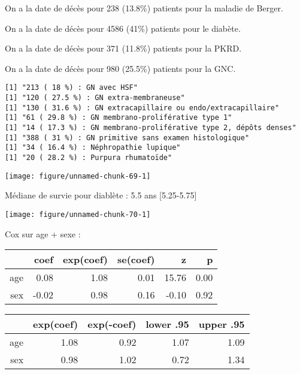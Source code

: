 \documentclass[11pt,a4paper]{article}\usepackage[]{graphicx}\usepackage[]{color}
\makeatletter
\def\maxwidth{ %
  \ifdim\Gin@nat@width>\linewidth
    \linewidth
  \else
    \Gin@nat@width
  \fi
}
\newenvironment{kframe}{%
 \def\at@end@of@kframe{}%
 \ifinner\ifhmode%
  \def\at@end@of@kframe{\end{minipage}}%
  \begin{minipage}{\columnwidth}%
 \fi\fi%
 \def\FrameCommand##1{\hskip\@totalleftmargin \hskip-\fboxsep
 \colorbox{shadecolor}{##1}\hskip-\fboxsep
     \hskip-\linewidth \hskip-\@totalleftmargin \hskip\columnwidth}%
 \MakeFramed {\advance\hsize-\width
   \@totalleftmargin\z@ \linewidth\hsize
   \@setminipage}}%
 {\par\unskip\endMakeFramed%
 \at@end@of@kframe}
\newenvironment{knitrout}{}{} %
\makeatother
\begin{document}
  On a la date de décès pour 238 (13.8\%) patients pour la maladie de Berger.
  
  On a la date de décès pour 4586 (41\%) patients pour le diabète.
  
  On a la date de décès pour 371 (11.8\%) patients pour la PKRD.
  
  On a la date de décès pour 980 (25.5\%) patients pour la GNC.

\begin{knitrout}
\color{fgcolor}\begin{kframe}
\begin{verbatim}
[1] "213 ( 18 %) : GN avec HSF"
[1] "120 ( 27.5 %) : GN extra-membraneuse"
[1] "130 ( 31.6 %) : GN extracapillaire ou endo/extracapillaire"
[1] "61 ( 29.8 %) : GN membrano-proliférative type 1"
[1] "14 ( 17.3 %) : GN membrano-proliférative type 2, dépôts denses"
[1] "388 ( 31 %) : GN primitive sans examen histologique"
[1] "34 ( 16.4 %) : Néphropathie lupique"
[1] "20 ( 28.2 %) : Purpura rhumatoïde"
\end{verbatim}
\end{kframe}
\end{knitrout}


\begin{knitrout}
\color{fgcolor}
\texttt{[image: figure/unnamed-chunk-69-1]} 

\end{knitrout}

Médiane de survie pour diablète : 5.5 ans [5.25-5.75]

\begin{knitrout}
\color{fgcolor}
\texttt{[image: figure/unnamed-chunk-70-1]} 

\end{knitrout}

Cox sur age + sexe :
\begin{table}[H]
\centering
\begin{tabular}{rrrrrr}
  \hline
 & coef & exp(coef) & se(coef) & z & p \\ 
  \hline
age & 0.08 & 1.08 & 0.01 & 15.76 & 0.00 \\ 
  sex & -0.02 & 0.98 & 0.16 & -0.10 & 0.92 \\ 
   \hline
\end{tabular}
\end{table}
\begin{table}[H]
\centering
\begin{tabular}{rrrrr}
  \hline
 & exp(coef) & exp(-coef) & lower .95 & upper .95 \\ 
  \hline
age & 1.08 & 0.92 & 1.07 & 1.09 \\ 
  sex & 0.98 & 1.02 & 0.72 & 1.34 \\ 
   \hline
\end{tabular}
\end{table}
\end{document}
